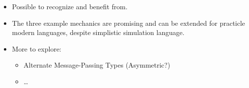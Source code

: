 \begin{slide}

    \begin{itemize}
        \item Possible to recognize and benefit from.
        \item The three example mechanics are promising and can be extended for
                practicle modern languages, despite simplistic simulation language.
        \item More to explore:
            \begin{itemize}
                \item Alternate Message-Passing Types (Asymmetric?)
                \item \ldots
            \end{itemize}
    \end{itemize}

\end{slide}


